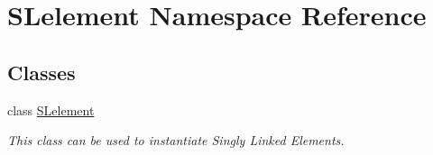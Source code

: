 \hypertarget{namespace_s_lelement}{}\section{S\+Lelement Namespace Reference}
\label{namespace_s_lelement}
\subsection*{Classes}
\begin{DoxyCompactItemize}
\item 
class \hyperlink{class_s_lelement_1_1_s_lelement}{S\+Lelement}
\begin{DoxyCompactList}\small\item\em This class can be used to instantiate Singly Linked Elements. \end{DoxyCompactList}\end{DoxyCompactItemize}
